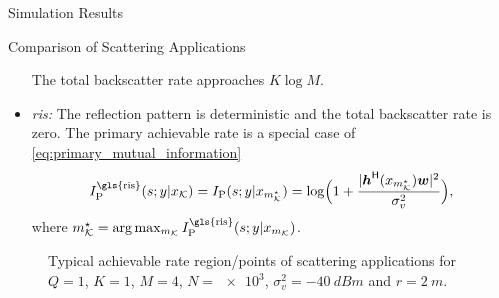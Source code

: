 \begin{section}{Simulation Results}
\begin{subsection}{Comparison of Scattering Applications}
\begin{itemize}
			The total backscatter rate approaches $K \log M$.
			\item \emph{\gls{ris}:} The reflection pattern is deterministic and the total backscatter rate is zero.
			The primary achievable rate is a special case of \eqref{eq:primary_mutual_information}
			\begin{equation}
				I_{\text{P}}^{\text{\gls{ris}}}(s;y|x_{\mathcal{K}}) = I_{\text{P}}(s;y|x_{m_{\mathcal{K}}^{\star}}) = \log \Bigl(1 + \frac{\lvert \boldsymbol{h}^\mathsf{H}(x_{m_{\mathcal{K}}^{\star}}) \boldsymbol{w} \rvert^2}{\sigma_v^2}\Bigr),
			\end{equation}
			where $m_{\mathcal{K}}^{\star} = \arg \max_{m_{\mathcal{K}}} I_{\text{P}}^{\text{\gls{ris}}}(s;y|x_{m_{\mathcal{K}}})$.
		\end{itemize}
		\begin{figure}[!t]
			\centering
			\resizebox{0.65\columnwidth}{!}{
				
			}
			\caption{Typical achievable rate region/points of scattering applications for $Q=1$, $K=1$, $M=4$, $N=\num{e3}$, $\sigma_v^2=\qty{-40}{dBm}$ and $r=\qty{2}{m}$.}
			\label{fg:region_comparison}
		\end{figure}


\end{subsection}
\end{section}
